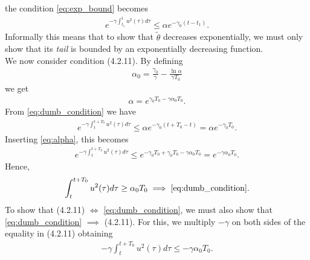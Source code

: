 \documentclass[]{article}
\begin{document}
the condition \eqref{eq:exp_bound} becomes
\begin{equation}\begin{aligned}
\label{eq:dumb_condition}
e^{-\gamma \int^{t}_{t_1}u^2(\tau)d \tau} \leq \alpha e^{-\gamma_0(t-t_1)}.
\end{aligned}\end{equation}
Informally this means that to show that $\tilde \theta$ decreases exponentially, we must only show that its \textit{tail} is bounded by an exponentially decreasing function. \\

We now consider condition (4.2.11). By defining
\begin{equation}\begin{aligned}
\alpha_0 = \frac{\gamma_0}{\gamma} - \frac{\ln \alpha}{\gamma T_0}
\end{aligned}\end{equation}
 we get
\begin{equation}\begin{aligned}
\label{eq:alpha}
\alpha = e^{\gamma_0 T_0 - \gamma \alpha_0 T_0}.
\end{aligned}\end{equation}
From \eqref{eq:dumb_condition} we have
\begin{equation}\begin{aligned}
e^{-\gamma\int^{t+T_0}_{t}u^2(\tau)d \tau} \leq \alpha e^{-\gamma_0(t+T_0-t)} = \alpha e^{-\gamma_0 T_0}.
\end{aligned}\end{equation}
Inserting \eqref{eq:alpha}, this becomes
\begin{equation}\begin{aligned}
\label{eq:cool_condition}
e^{-\gamma\int^{t+T_0}_{t}u^2(\tau)d \tau} \leq e^{-\gamma_0 T_0 + \gamma_0 T_0 - \gamma \alpha_0 T_0} = e^{ - \gamma \alpha_0 T_0}.
\end{aligned}\end{equation}
Hence,
\begin{equation}\begin{aligned}
\int^{t+T_0}_{t}u^2(\tau)d \tau \geq \alpha_0 T_0 \implies \eqref{eq:dumb_condition}.
\end{aligned}\end{equation}
To show that (4.2.11) $\iff$ \eqref{eq:dumb_condition}, we must also show that \eqref{eq:dumb_condition} $\implies$ (4.2.11). For this, we multiply $-\gamma$ on both sides of the equality in (4.2.11) obtaining
\begin{equation}\begin{aligned}
-\gamma \int^{t+T_0}_{t}u^2(\tau)d \tau \leq -\gamma \alpha_0 T_0.
\end{aligned}\end{equation}
\end{document}
